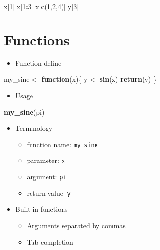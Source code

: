 \documentclass[]{book}
\newenvironment{Shaded}{\begin{snugshade}}{\end{snugshade}}
\newcommand{\KeywordTok}[1]{\textcolor[rgb]{0.13,0.29,0.53}{\textbf{#1}}}
\newcommand{\DecValTok}[1]{\textcolor[rgb]{0.00,0.00,0.81}{#1}}
\newcommand{\StringTok}[1]{\textcolor[rgb]{0.31,0.60,0.02}{#1}}
\newcommand{\ControlFlowTok}[1]{\textcolor[rgb]{0.13,0.29,0.53}{\textbf{#1}}}
\newcommand{\OperatorTok}[1]{\textcolor[rgb]{0.81,0.36,0.00}{\textbf{#1}}}
\newcommand{\NormalTok}[1]{#1}
\providecommand{\tightlist}{%
  \setlength{\itemsep}{0pt}\setlength{\parskip}{0pt}}
\begin{document}
\begin{Shaded}
\begin{Highlighting}[]
\NormalTok{x[}\DecValTok{1}\NormalTok{]}
\NormalTok{x[}\DecValTok{1}\OperatorTok{:}\DecValTok{3}\NormalTok{]}
\NormalTok{x[}\KeywordTok{c}\NormalTok{(}\DecValTok{1}\NormalTok{,}\DecValTok{2}\NormalTok{,}\DecValTok{4}\NormalTok{)]}
\NormalTok{y[}\DecValTok{3}\NormalTok{]}
\end{Highlighting}
\end{Shaded}

\hypertarget{functions}{%
\section{Functions}\label{functions}}

\begin{itemize}
\tightlist
\item
  Function define
\end{itemize}

\begin{Shaded}
\begin{Highlighting}[]
\NormalTok{my_sine <-}\StringTok{ }\ControlFlowTok{function}\NormalTok{(x)\{}
\NormalTok{    y <-}\StringTok{ }\KeywordTok{sin}\NormalTok{(x)}
    \KeywordTok{return}\NormalTok{(y)}
\NormalTok{\}}
\end{Highlighting}
\end{Shaded}

\begin{itemize}
\tightlist
\item
  Usage
\end{itemize}

\begin{Shaded}
\begin{Highlighting}[]
\KeywordTok{my_sine}\NormalTok{(pi)}
\end{Highlighting}
\end{Shaded}

\begin{itemize}
\tightlist
\item
  Terminology

  \begin{itemize}
  \tightlist
  \item
    function name: \texttt{my\_sine}
  \item
    parameter: \texttt{x}
  \item
    argument: \texttt{pi}
  \item
    return value: \texttt{y}
  \end{itemize}
\item
  Built-in functions

  \begin{itemize}
  \tightlist
  \item
    Arguments separated by commas
  \item
    Tab completion
  \end{itemize}
\end{itemize}
\end{document}
